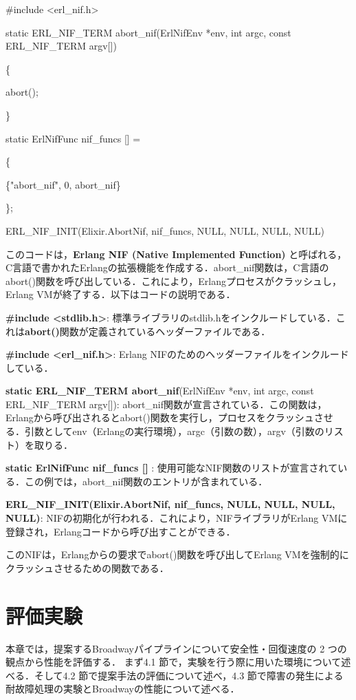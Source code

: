 \documentclass[a4paper]{jreport}	%
\begin{document}
\#include <erl\_nif.h>

static ERL\_NIF\_TERM abort\_nif(ErlNifEnv *env, int argc, const ERL\_NIF\_TERM argv[])

\{

    abort();
    
\}

static ErlNifFunc nif\_funcs [] =

\{

    \{"abort\_nif", 0, abort\_nif\}
    
\};

ERL\_NIF\_INIT(Elixir.AbortNif, nif\_funcs, NULL, NULL, NULL, NULL)

このコードは，\textbf{Erlang NIF (Native Implemented Function)} と呼ばれる，C言語で書かれたErlangの拡張機能を作成する．abort\_nif関数は，C言語のabort()関数を呼び出している．これにより，Erlangプロセスがクラッシュし，Erlang VMが終了する．以下はコードの説明である．

\textbf{\#include <stdlib.h>}: 標準ライブラリのstdlib.hをインクルードしている．これは\textbf{abort()}関数が定義されているヘッダーファイルである．

\textbf{\#include <erl\_nif.h>}: Erlang NIFのためのヘッダーファイルをインクルードしている．

\textbf{static ERL\_NIF\_TERM abort\_nif}(ErlNifEnv *env, int argc, const ERL\_NIF\_TERM argv[]): abort\_nif関数が宣言されている．この関数は，Erlangから呼び出されるとabort()関数を実行し，プロセスをクラッシュさせる．引数としてenv（Erlangの実行環境），argc（引数の数），argv（引数のリスト）を取りる．

\textbf{static ErlNifFunc nif\_funcs [] }: 使用可能なNIF関数のリストが宣言されている．この例では，abort\_nif関数のエントリが含まれている．

\textbf{ERL\_NIF\_INIT(Elixir.AbortNif, nif\_funcs, NULL, NULL, NULL, NULL)}: NIFの初期化が行われる．これにより，NIFライブラリがErlang VMに登録され，Erlangコードから呼び出すことができる．

このNIFは，Erlangからの要求でabort()関数を呼び出してErlang VMを強制的にクラッシュさせるための関数である．

\chapter{評価実験}
本章では，提案するBroadwayパイプラインについて安全性・回復速度の 2 つの観点から性能を評価する．
まず4.1 節で，実験を行う際に用いた環境について述べる．そして4.2 節で提案手法の評価について述べ，4.3 節で障害の発生による耐故障処理の実験とBroadwayの性能について述べる．
\end{document}
